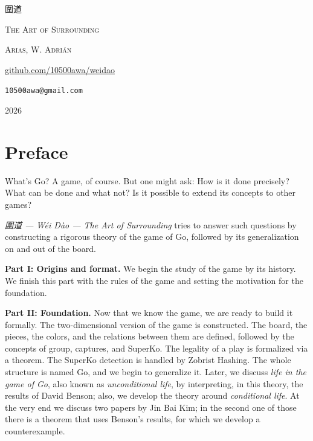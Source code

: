 \begin{titlepage}
	\centering
	\vspace*{4cm}
	
	{\fontsize{90}{100}\selectfont 圍道}\par
	
	\vspace{1.5em}
	
	{\Large\scshape The Art of Surrounding}\par
	
	\vspace{3cm}
	
	
	\vfill %
	
	{\large
		\textsc{Arias, W. Adrián}\par
		\footnotesize{
		\url{github.com/10500awa/weidao}\par
		\texttt{10500awa@gmail.com}\par}
	}
	
	\vspace{2em}
	
	{\normalsize 2026\par}
	
	\vspace*{1cm}
\end{titlepage}

\section*{Preface}
\thispagestyle{empty}
What's Go? A game, of course. But one might ask: How is it done precisely? What can be done and what not? Is it possible to extend its concepts to other games?

\textit{圍道 — Wéi Dào — The Art of Surrounding} tries to answer such questions by constructing a rigorous theory of the game of Go, followed by its generalization on and out of the board.

\textbf{Part I: Origins and format.} We begin the study of the game by its history. We finish this part with the rules of the game and setting the motivation for the foundation.

\textbf{Part II: Foundation.} Now that we know the game, we are ready to build it formally. The two-dimensional version of the game is constructed. The board, the pieces, the colors, and the relations between them are defined, followed by the concepts of group, captures, and SuperKo. The legality of a play is formalized via a theorem. The SuperKo detection is handled by Zobrist Hashing. The whole structure is named Go, and we begin to generalize it. Later, we discuss \textit{life in the game of Go}, also known as \textit{unconditional life}, by interpreting, in this theory, the results of David Benson; also, we develop the theory around \textit{conditional life}. At the very end we discuss two papers by Jin Bai Kim; in the second one of those there is a theorem that uses Benson's results, for which we develop a counterexample.

